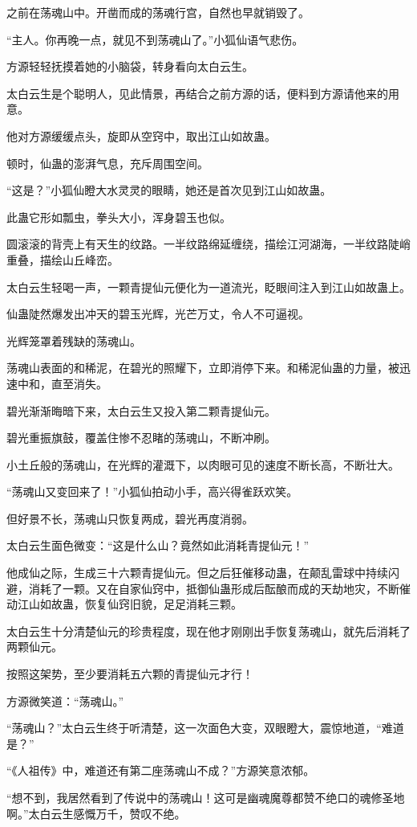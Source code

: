 \begin{this_body}
之前在荡魂山中。开凿而成的荡魂行宫，自然也早就销毁了。

“主人。你再晚一点，就见不到荡魂山了。”小狐仙语气悲伤。

方源轻轻抚摸着她的小脑袋，转身看向太白云生。

太白云生是个聪明人，见此情景，再结合之前方源的话，便料到方源请他来的用意。

他对方源缓缓点头，旋即从空窍中，取出江山如故蛊。

顿时，仙蛊的澎湃气息，充斥周围空间。

“这是？”小狐仙瞪大水灵灵的眼睛，她还是首次见到江山如故蛊。

此蛊它形如瓢虫，拳头大小，浑身碧玉也似。

圆滚滚的背壳上有天生的纹路。一半纹路绵延缠绕，描绘江河湖海，一半纹路陡峭重叠，描绘山丘峰峦。

太白云生轻喝一声，一颗青提仙元便化为一道流光，眨眼间注入到江山如故蛊上。

仙蛊陡然爆发出冲天的碧玉光辉，光芒万丈，令人不可逼视。

光辉笼罩着残缺的荡魂山。

荡魂山表面的和稀泥，在碧光的照耀下，立即消停下来。和稀泥仙蛊的力量，被迅速中和，直至消失。

碧光渐渐晦暗下来，太白云生又投入第二颗青提仙元。

碧光重振旗鼓，覆盖住惨不忍睹的荡魂山，不断冲刷。

小土丘般的荡魂山，在光辉的灌溉下，以肉眼可见的速度不断长高，不断壮大。

“荡魂山又变回来了！”小狐仙拍动小手，高兴得雀跃欢笑。

但好景不长，荡魂山只恢复两成，碧光再度消弱。

太白云生面色微变：“这是什么山？竟然如此消耗青提仙元！”

他成仙之际，生成三十六颗青提仙元。但之后狂催移动蛊，在颠乱雷球中持续闪避，消耗了一颗。又在自家仙窍中，抵御仙蛊形成后酝酿而成的天劫地灾，不断催动江山如故蛊，恢复仙窍旧貌，足足消耗三颗。

太白云生十分清楚仙元的珍贵程度，现在他才刚刚出手恢复荡魂山，就先后消耗了两颗仙元。

按照这架势，至少要消耗五六颗的青提仙元才行！

方源微笑道：“荡魂山。”

“荡魂山？”太白云生终于听清楚，这一次面色大变，双眼瞪大，震惊地道，“难道是？”

“《人祖传》中，难道还有第二座荡魂山不成？”方源笑意浓郁。

“想不到，我居然看到了传说中的荡魂山！这可是幽魂魔尊都赞不绝口的魂修圣地啊。”太白云生感慨万千，赞叹不绝。


\end{this_body}
